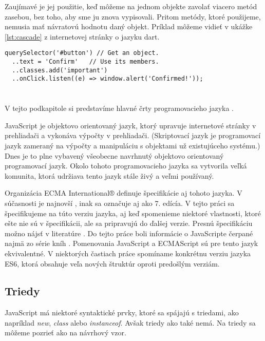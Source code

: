 Zaujímavé je jej použitie, keď môžeme na jednom objekte zavolať viacero metód zasebou, bez toho, aby sme ju znova vypisovali. Pritom metódy, ktoré použijeme, nemusia mať návratovú hodnotu daný objekt. Príklad môžeme vidieť v ukážke \ref{lst:cascade} z internetovej stránky o jazyku dart\cite{dartLanguageTour}.

\begin{lstlisting}[caption=Kaskádová notácia, label={lst:cascade}]
querySelector('#button') // Get an object.
  ..text = 'Confirm'   // Use its members.
  ..classes.add('important')
  ..onClick.listen((e) => window.alert('Confirmed!'));
\end{lstlisting}







\section{\JS{}}
V tejto podkapitole si predstavíme hlavné črty programovacieho jazyka \JS{}. 

JavaScript je objektovo orientovaný jazyk, ktorý upravuje internetové stránky v prehliadači a vykonáva výpočty v prehliadači.
(Skriptovací jazyk je programovací jazyk zameraný na výpočty a manipuláciu s objektami už existujúceho systému.)
Dnes je to plne vybavený všeobecne navrhnutý objektovo orientovaný programovací jazyk.
Okolo tohoto programovacieho jazyka sa vytvorila veľká komunita, ktorá udržiava tento jazyk stále živý a veľmi používaný.

Organizácia {ECMA International®} definuje špecifikácie aj tohoto jazyka. V súčasnosti je najnovší \JS{}, inak sa označuje aj ako 7. edícía. V tejto práci sa špecifikujeme na túto verziu jazyka, aj keď spomenieme niektoré vlastnosti, ktoré ešte nie sú v špecifikácii, ale sa pripravujú do ďalšej verzie. Presnú špecifikáciu možno nájsť v literatúre \cite[\JS{}]{ECMAScript}.
Do tejto práce boli informácie o JavaScripte čerpané najmä zo série kníh \cite[You Don't Know JS]{youDontKnowJS1, youDontKnowJS2, youDontKnowJS3, youDontKnowJS4, youDontKnowJS5, youDontKnowJS6}.
Pomenovania JavaScript a ECMAScript sú pre tento jazyk ekvivalentné.
V niektorých častiach práce spomíname konkrétnu verziu jazyka ES6, ktorá obsahuje veľa nových štruktúr oproti predošlým verziám.

\subsection{Triedy}
JavaScript má niektoré syntaktické prvky, ktoré sa spájajú s triedami, ako napríklad \emph{new}, \emph{class} alebo \emph{instanceof}. Avšak triedy ako také nemá. Na triedy sa môžeme pozrieť ako na návrhový vzor. 

